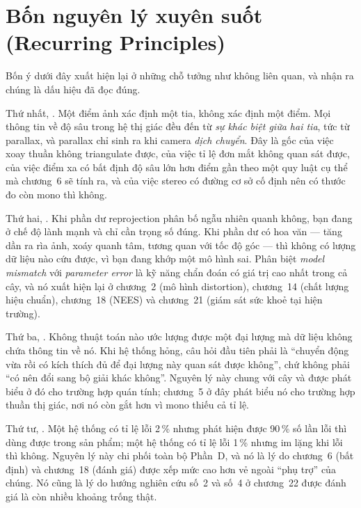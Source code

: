\documentclass[vslam.tex]{subfiles}
\begin{document}
\section*{Bốn nguyên lý xuyên suốt (Recurring Principles)}

Bốn ý dưới đây xuất hiện lại ở những chỗ tưởng như không liên quan, và nhận ra chúng là dấu hiệu đã đọc đúng.

Thứ nhất, . Một điểm ảnh xác định một tia, không xác định một điểm. Mọi thông tin về độ sâu trong hệ thị giác đều đến từ \emph{sự khác biệt giữa hai tia}, tức từ parallax, và parallax chỉ sinh ra khi camera \emph{dịch chuyển}. Đây là gốc của việc xoay thuần không triangulate được, của việc tỉ lệ đơn mắt không quan sát được, của việc điểm xa có bất định độ sâu lớn hơn điểm gần theo một quy luật cụ thể mà chương~6 sẽ tính ra, và của việc stereo có đường cơ sở cố định nên có thước đo còn mono thì không.

Thứ hai, . Khi phần dư reprojection phân bố ngẫu nhiên quanh không, bạn đang ở chế độ lành mạnh và chỉ cần trọng số đúng. Khi phần dư có hoa văn --- tăng dần ra rìa ảnh, xoáy quanh tâm, tương quan với tốc độ góc --- thì không có lượng dữ liệu nào cứu được, vì bạn đang khớp một mô hình sai. Phân biệt \emph{model mismatch} với \emph{parameter error} là kỹ năng chẩn đoán có giá trị cao nhất trong cả cây, và nó xuất hiện lại ở chương~2 (mô hình distortion), chương~14 (chất lượng hiệu chuẩn), chương~18 (NEES) và chương~21 (giám sát sức khoẻ tại hiện trường).

Thứ ba, . Không thuật toán nào ước lượng được một đại lượng mà dữ liệu không chứa thông tin về nó. Khi hệ thống hỏng, câu hỏi đầu tiên phải là ``chuyển động vừa rồi có kích thích đủ để đại lượng này quan sát được không'', chứ không phải ``có nên đổi sang bộ giải khác không''. Nguyên lý này chung với cây  và được phát biểu ở đó cho trường hợp quán tính; chương~5 ở đây phát biểu nó cho trường hợp thuần thị giác, nơi nó còn gắt hơn vì mono thiếu cả tỉ lệ.

Thứ tư, . Một hệ thống có tỉ lệ lỗi 2\,\% nhưng phát hiện được 90\,\% số lần lỗi thì dùng được trong sản phẩm; một hệ thống có tỉ lệ lỗi 1\,\% nhưng im lặng khi lỗi thì không. Nguyên lý này chi phối toàn bộ Phần~D, và nó là lý do chương~6 (bất định) và chương~18 (đánh giá) được xếp mức cao hơn vẻ ngoài ``phụ trợ'' của chúng. Nó cũng là lý do hướng nghiên cứu số~2 và số~4 ở chương~22 được đánh giá là còn nhiều khoảng trống thật.
\end{document}
